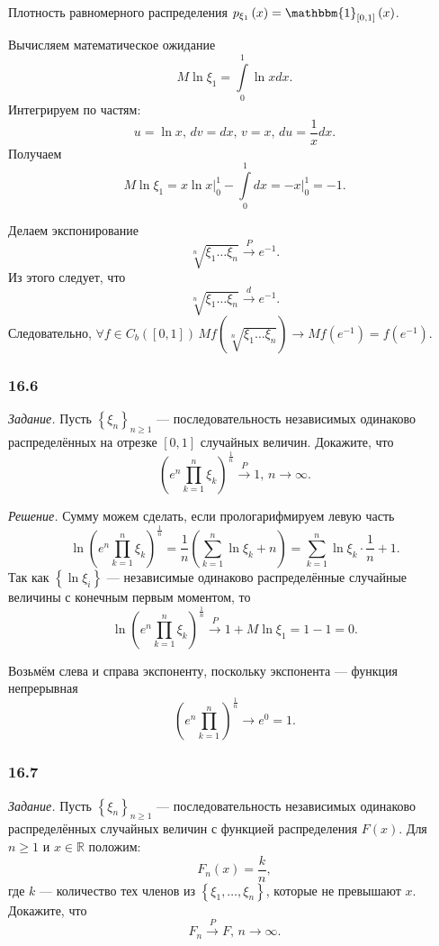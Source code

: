 \begin{enumerate}[label=\alph*)]
Плотность равномерного распределения
$p_{ \xi_1} \left( x \right) =
  \mathbbm{1}_{ \left[ 0, 1 \right]} \left( x \right)$.

Вычисляем математическое ожидание
$$M \ln \xi_1 =
  \int \limits_0^1 \ln xdx.$$
Интегрируем по частям:
$$u = \ln x, \,
  dv = dx, \,
  v = x, \,
  du = \frac{1}{x} dx.$$
Получаем
$$M \ln \xi_1 =
  \left. x \ln x \right|_0^1 - \int \limits_0^1 dx =
  \left. -x \right|_0^1 =
  -1.$$

Делаем экспонирование
$$ \sqrt[n]{ \xi_1 \dotsc \xi_n} \overset{P}{ \rightarrow }
  e^{-1}.$$
Из этого следует, что
$$ \sqrt[n]{ \xi_1 \dotsc \xi_n} \overset{d}{ \rightarrow } e^{-1}.$$
Следовательно,
$ \forall f \in C_b \left( \left[ 0, 1 \right] \right) \,
  Mf \left( \sqrt[n]{ \xi_1 \dotsc \xi_n} \right) \to Mf \left( e^{-1} \right) =
  f \left( e^{-1} \right) $.
\end{enumerate}

\subsubsection{16.6}

\textit{Задание.}
Пусть $ \left\{ \xi_n \right\}_{n \geq 1}$ ---
последовательность независимых одинаково распределённых на отрезке $ \left[ 0, 1 \right] $
случайных величин.
Докажите, что
$$ \left( e^n \prod \limits_{k = 1}^n \xi_k \right)^{ \frac{1}{n}} \overset{P}{ \rightarrow }
  1, \,
  n \to \infty.$$

\textit{Решение.} Сумму можем сделать, если прологарифмируем левую часть
$$ \ln \left( e^n \prod \limits_{k = 1}^n \xi_k \right)^{ \frac{1}{n}} =
  \frac{1}{n} \left( \sum \limits_{k = 1}^n \ln \xi_k + n \right) =
  \sum \limits_{k = 1}^n \ln \xi_k \cdot \frac{1}{n} + 1.$$
Так как $ \left\{ \ln \xi_i \right\} $ ---
независимые одинаково распределённые случайные величины с конечным первым моментом, то
$$ \ln \left( e^n \prod \limits_{k = 1}^n \xi_k \right)^{ \frac{1}{n}} \overset{P}{ \rightarrow }
  1 + M \ln \xi_1 =
  1 - 1 =
  0.$$

Возьмём слева и справа экспоненту, поскольку экспонента --- функция непрерывная
$$ \left( e^n \prod \limits_{k = 1}^n \right)^{ \frac{1}{n}} \to
  e^0 =
  1.$$

\subsubsection{16.7}

\textit{Задание.}
Пусть $ \left\{ \xi_n \right\}_{n \geq 1}$ ---
последовательность независимых одинаково распределённых случайных величин с функцией распределения
$F \left( x \right) $.
Для $n \geq 1$ и $x \in \mathbb{R}$ положим:
$$F_n \left( x \right) =
  \frac{k}{n},$$
где $k$ --- количество тех членов из $ \left\{ \xi_1, \dotsc, \xi_n \right\} $,
которые не превышают $x$.
Докажите, что
$$F_n \overset{P}{ \rightarrow } F, \,
  n \to \infty.$$

